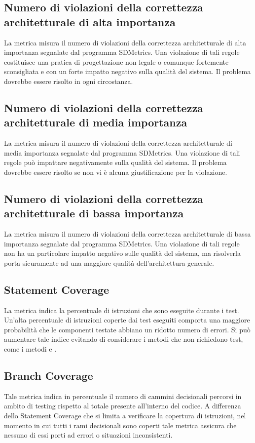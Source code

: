 \subsection{Numero di violazioni della correttezza architetturale di alta importanza}
La metrica misura il numero di violazioni della correttezza architetturale di alta importanza segnalate dal programma SDMetrics. Una violazione di tali regole costituisce una pratica di progettazione non legale o comunque fortemente sconsigliata e con un forte impatto negativo sulla qualità del sistema. Il problema dovrebbe essere risolto in ogni circostanza.

\subsection{Numero di violazioni della correttezza architetturale di media importanza}
La metrica misura il numero di violazioni della correttezza architetturale di media importanza segnalate dal programma SDMetrics. Una violazione di tali regole può impattare negativamente sulla qualità del sistema. Il problema dovrebbe essere risolto se non vi è alcuna giustificazione per la violazione.

\subsection{Numero di violazioni della correttezza architetturale di bassa importanza}
La metrica misura il numero di violazioni della correttezza architetturale di bassa importanza segnalate dal programma SDMetrics. Una violazione di tali regole non ha un particolare impatto negativo sulle qualità del sistema, ma risolverla porta sicuramente ad una maggiore qualità dell'architettura generale.

\subsection{Statement Coverage}
La metrica indica la percentuale di istruzioni che sono eseguite durante i test. Un'alta percentuale di istruzioni coperte dai test eseguiti comporta una maggiore probabilità che le componenti testate abbiano un ridotto numero di errori. Si può aumentare tale indice evitando di considerare i metodi che non richiedono test, come i metodi  e .

\subsection{Branch Coverage}
Tale metrica indica in percentuale il numero di cammini decisionali percorsi in ambito di testing rispetto al totale presente all'interno del codice. A differenza dello Statement Coverage che si limita a verificare la copertura di istruzioni, nel momento in cui tutti i rami decisionali sono coperti tale metrica assicura che nessuno di essi porti ad errori o situazioni inconsistenti.

